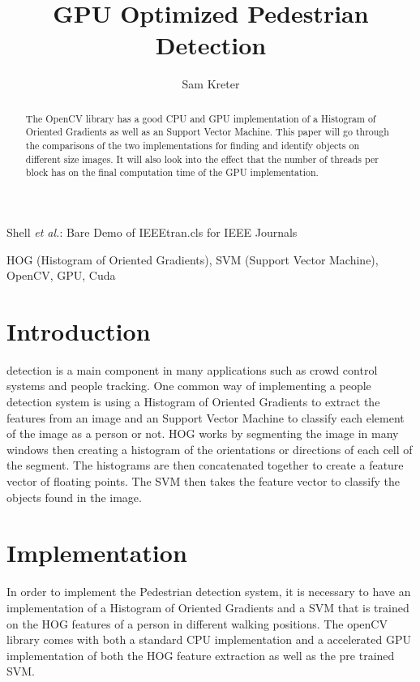 \documentclass[journal]{IEEEtran}
\begin{document}
\title{GPU Optimized Pedestrian Detection}


\author{Sam Kreter}

{Shell \MakeLowercase{\textit{et al.}}: Bare Demo of IEEEtran.cls for IEEE Journals}

\maketitle

\begin{abstract}
The OpenCV library has a good CPU and GPU implementation of a Histogram of Oriented Gradients as well as an Support Vector Machine. This paper will go through the comparisons of the two implementations for finding and identify objects on different size images. It will also look into the effect that the number of threads per block has on the final computation time of the GPU implementation.
\end{abstract}

\begin{IEEEkeywords}
    HOG (Histogram of Oriented Gradients), SVM (Support Vector Machine), OpenCV, GPU, Cuda
\end{IEEEkeywords}

\IEEEpeerreviewmaketitle

\section{Introduction}
 detection is a main component in many applications such as crowd control systems and people tracking. One common way of implementing a people detection system is using a Histogram of Oriented Gradients to extract the features from an image and an Support Vector Machine to classify each element of the image as a person or not. HOG works by segmenting the image in many windows then creating a histogram of the orientations or directions of each cell of the segment. The histograms are then concatenated together to create a feature vector of floating points. The SVM then takes the feature vector to classify the objects found in the image. \\

\section{Implementation}
    In order to implement the Pedestrian detection system, it is necessary to have an implementation of a Histogram of Oriented Gradients and a SVM that is trained on the HOG features of a person in different walking positions. The openCV library comes with both a standard CPU implementation and a accelerated GPU implementation of both the HOG feature extraction as well as the pre trained SVM. \\
\end{document}
